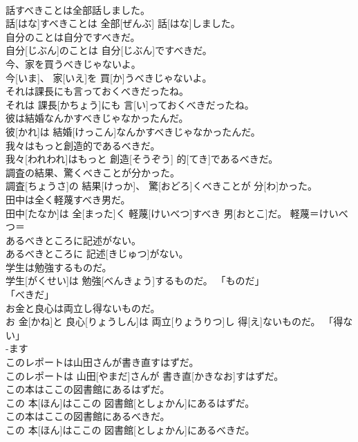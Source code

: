 \documentclass[8pt]{extreport}
\begin{document}
\begin{CJK}{UTF8}{min}
\\	話すべきことは全部話しました。	
\\	話[はな]すべきことは 全部[ぜんぶ] 話[はな]しました。	
\\	自分のことは自分ですべきだ。	
\\	自分[じぶん]のことは 自分[じぶん]ですべきだ。	
\\	今、家を買うべきじゃないよ。	
\\	今[いま]、 家[いえ]を 買[か]うべきじゃないよ。	
\\	それは課長にも言っておくべきだったね。	
\\	それは 課長[かちょう]にも 言[い]っておくべきだったね。	
\\	彼は結婚なんかすべきじゃなかったんだ。	
\\	彼[かれ]は 結婚[けっこん]なんかすべきじゃなかったんだ。	
\\	我々はもっと創造的であるべきだ。	
\\	我々[われわれ]はもっと 創造[そうぞう] 的[てき]であるべきだ。	
\\	調査の結果、驚くべきことが分かった。	
\\	調査[ちょうさ]の 結果[けっか]、 驚[おどろ]くべきことが 分[わ]かった。	
\\	田中は全く軽蔑すべき男だ。	
\\	田中[たなか]は 全[まった]く 軽蔑[けいべつ]すべき 男[おとこ]だ。	軽蔑＝けいべつ＝ 
\\	あるべきところに記述がない。	
\\	あるべきところに 記述[きじゅつ]がない。	
\\	学生は勉強するものだ。	
\\	学生[がくせい]は 勉強[べんきょう]するものだ。	「ものだ」
\\	「べきだ」
\\	お金と良心は両立し得ないものだ。	
\\	お 金[かね]と 良心[りょうしん]は 両立[りょうりつ]し 得[え]ないものだ。	「得ない」
\\	-ます 
\\	このレポートは山田さんが書き直すはずだ。	
\\	このレポートは 山田[やまだ]さんが 書き直[かきなお]すはずだ。	
\\	この本はここの図書館にあるはずだ。	
\\	この 本[ほん]はここの 図書館[としょかん]にあるはずだ。	
\\	この本はここの図書館にあるべきだ。	
\\	この 本[ほん]はここの 図書館[としょかん]にあるべきだ。	

\end{CJK}
\end{document}
